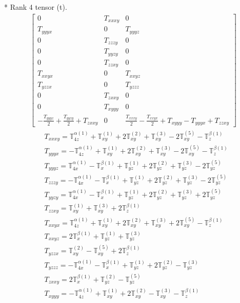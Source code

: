 \documentclass[fleqn,8pt,landscape]{jsarticle}
\begin{document}
* Rank 4 tensor (t).
\begin{align*}
\begin{bmatrix} 0 & T_{xxxy} & 0 \\ T_{yyyx} & 0 & T_{yyyz} \\ 0 & T_{zzzy} & 0 \\ 0 & T_{yyzy} & 0 \\ 0 & T_{zzxy} & 0 \\ T_{xxyx} & 0 & T_{xxyz} \\ T_{yzzx} & 0 & T_{yzzz} \\ 0 & T_{zxxy} & 0 \\ 0 & T_{xyyy} & 0 \\ - \frac{T_{yyyz}}{2} + \frac{T_{yyzy}}{2} + T_{zxxy} & 0 & \frac{T_{xxxy}}{2} - \frac{T_{xxyx}}{2} + T_{xyyy} - T_{yyyx} + T_{zzxy} \end{bmatrix}
\end{align*}
\begin{align*}
& T_{xxxy} = \mathbb{T}_{4z}^{\alpha(1)} + \mathbb{T}_{xy}^{(1)} + 2 \mathbb{T}_{xy}^{(2)} + \mathbb{T}_{xy}^{(3)} - 2 \mathbb{T}_{xy}^{(5)} - \mathbb{T}_{z}^{\beta(1)} \\
& T_{yyyx} = - \mathbb{T}_{4z}^{\alpha(1)} + \mathbb{T}_{xy}^{(1)} + 2 \mathbb{T}_{xy}^{(2)} + \mathbb{T}_{xy}^{(3)} - 2 \mathbb{T}_{xy}^{(5)} - \mathbb{T}_{z}^{\beta(1)} \\
& T_{yyyz} = \mathbb{T}_{4x}^{\alpha(1)} - \mathbb{T}_{x}^{\beta(1)} + \mathbb{T}_{yz}^{(1)} + 2 \mathbb{T}_{yz}^{(2)} + \mathbb{T}_{yz}^{(3)} - 2 \mathbb{T}_{yz}^{(5)} \\
& T_{zzzy} = - \mathbb{T}_{4x}^{\alpha(1)} - \mathbb{T}_{x}^{\beta(1)} + \mathbb{T}_{yz}^{(1)} + 2 \mathbb{T}_{yz}^{(2)} + \mathbb{T}_{yz}^{(3)} - 2 \mathbb{T}_{yz}^{(5)} \\
& T_{yyzy} = \mathbb{T}_{4x}^{\alpha(1)} - \mathbb{T}_{x}^{\beta(1)} + \mathbb{T}_{yz}^{(1)} + 2 \mathbb{T}_{yz}^{(2)} + \mathbb{T}_{yz}^{(3)} + 2 \mathbb{T}_{yz}^{(5)} \\
& T_{zzxy} = \mathbb{T}_{xy}^{(1)} + \mathbb{T}_{xy}^{(3)} + 2 \mathbb{T}_{z}^{\beta(1)} \\
& T_{xxyx} = \mathbb{T}_{4z}^{\alpha(1)} + \mathbb{T}_{xy}^{(1)} + 2 \mathbb{T}_{xy}^{(2)} + \mathbb{T}_{xy}^{(3)} + 2 \mathbb{T}_{xy}^{(5)} - \mathbb{T}_{z}^{\beta(1)} \\
& T_{xxyz} = 2 \mathbb{T}_{x}^{\beta(1)} + \mathbb{T}_{yz}^{(1)} + \mathbb{T}_{yz}^{(3)} \\
& T_{yzzx} = \mathbb{T}_{xy}^{(2)} - \mathbb{T}_{xy}^{(5)} + 2 \mathbb{T}_{z}^{\beta(1)} \\
& T_{yzzz} = - \mathbb{T}_{4x}^{\alpha(1)} - \mathbb{T}_{x}^{\beta(1)} + \mathbb{T}_{yz}^{(1)} + 2 \mathbb{T}_{yz}^{(2)} - \mathbb{T}_{yz}^{(3)} \\
& T_{zxxy} = 2 \mathbb{T}_{x}^{\beta(1)} + \mathbb{T}_{yz}^{(2)} - \mathbb{T}_{yz}^{(5)} \\
& T_{xyyy} = - \mathbb{T}_{4z}^{\alpha(1)} + \mathbb{T}_{xy}^{(1)} + 2 \mathbb{T}_{xy}^{(2)} - \mathbb{T}_{xy}^{(3)} - \mathbb{T}_{z}^{\beta(1)}
\end{align*}
\end{document}
